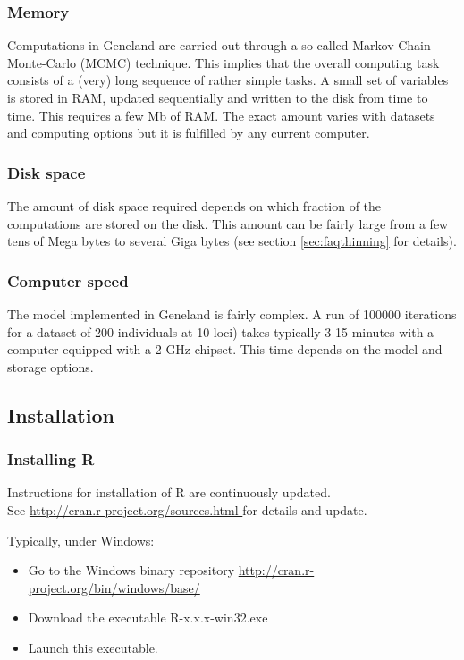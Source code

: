 \documentclass[a4paper,10pt]{article}
\begin{document}
\subsubsection{Memory}
Computations in {\sc Geneland} are carried out through a so-called Markov Chain Monte-Carlo (MCMC) technique. This implies that the 
overall computing task consists of a (very) long sequence of rather simple tasks. A small set of variables is stored in RAM, 
updated sequentially and written to the disk from time to time. This requires a few Mb  of RAM. The exact amount varies 
with datasets and computing options but it is fulfilled by any current computer. 

\subsubsection{Disk space}
The amount of disk space required depends on which fraction of the computations are stored on the disk. 
This amount can be fairly large from a few tens of Mega bytes to several Giga bytes 
(see section \ref{sec:faqthinning} for details). 

\subsubsection{Computer speed}
The model implemented in {\sc Geneland} is fairly complex. A  run of 100000 iterations for a dataset of 200 individuals at 10 loci) 
takes typically 3-15 minutes with a computer equipped with a 2 GHz chipset. This time depends on the 
model and storage options.



\subsection{Installation}

\subsubsection{Installing R}
Instructions for installation of R are continuously updated.\\
See \url{ http://cran.r-project.org/sources.html } for details and update.
 
Typically, under Windows:
\begin{itemize}
\item Go to the Windows binary repository \url{http://cran.r-project.org/bin/windows/base/}
\item Download the executable R-x.x.x-win32.exe  
\item Launch this executable.
\end{itemize}   
\end{document}
